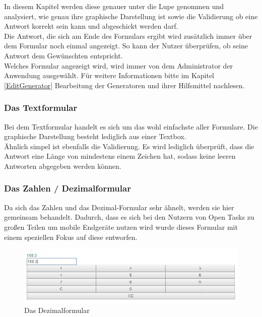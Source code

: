 In diesem Kapitel werden diese genauer unter die Lupe genommen und analysiert, wie genau ihre graphische Darstellung ist sowie die Validierung ob eine Antwort korrekt sein kann und abgeschickt werden darf. \\
Die Antwort, die sich am Ende des Formulars ergibt wird zusätzlich immer über dem Formular noch einmal angezeigt. So kann der Nutzer überprüfen, ob seine Antwort dem Gewünschten entspricht. \\
Welches Formular angezeigt wird, wird immer von dem Administrator der Anwendung ausgewählt. Für weitere Informationen bitte im Kapitel \ref{EditGenerator} Bearbeitung der Generatoren und ihrer Hilfsmittel nachlesen.


\subsubsection{Das Textformular}

Bei dem Textformular handelt es sich um das wohl einfachste aller Formulare. Die graphische Darstellung besteht lediglich aus einer Textbox. \\
Ähnlich simpel ist ebenfalls die Validierung. Es wird lediglich überprüft, dass die Antwort eine Länge von mindestens einem Zeichen hat, sodass keine leeren Antworten abgegeben werden können.

\subsubsection{Das Zahlen / Dezimalformular}

Da sich das Zahlen und das Dezimal-Formular sehr ähnelt, werden sie hier gemeinsam behandelt. Dadurch, dass es sich bei den Nutzern von Open Tasks zu großen Teilen um mobile Endgeräte nutzen wird wurde dieses Formular mit einem speziellen Fokus auf diese entworfen.

\begin{figure}[htp]     %
\centering
\includegraphics[width=1\textwidth]{bilder/DezimalForm} 
\caption[Das Dezimalformular]{Das Dezimalformular}
\end{figure} 

